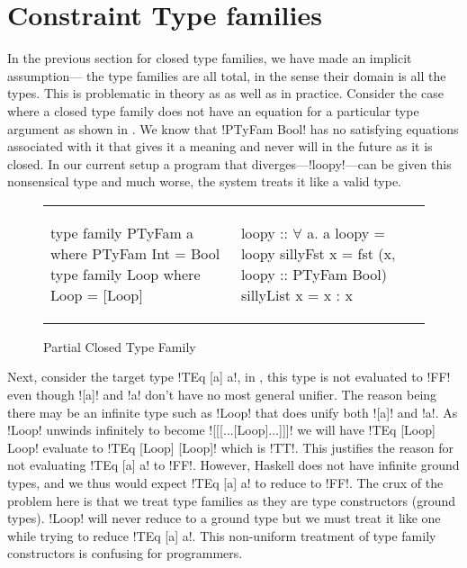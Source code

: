 \documentclass[format=acmsmall,manuscript,review,screen,nonacm,margin=1in,11pt]{acmart}
\begin{document}
\section{Constraint Type families}\label{sec:tf-constrained}
In the previous section for closed type families, we have made an implicit assumption---
the type families are all total, in the sense their domain is all the types.
This is problematic in theory as as well as in practice.
Consider the case where a closed type family does not have an equation for a particular type argument
as shown in . We know that !PTyFam Bool!
has no satisfying equations associated with it that gives it a meaning and never will in the future
as it is closed. In our current setup a program that diverges---!loopy!---can be given
this nonsensical type and much worse, the system treats it like a valid type.
\begin{figure}[ht]
    \footnotesize
  \begin{tabular}{l l}
\begin{code}
type family PTyFam a where
  PTyFam Int = Bool
type family Loop where
  Loop = [Loop]
\end{code}&%
\begin{code}
loopy :: $\forall$ a. a
loopy = loopy
sillyFst x = fst (x, loopy :: PTyFam Bool)
sillyList x = x : x
\end{code}
  \end{tabular}
  \caption{Partial Closed Type Family}
  \label{fig:incomplete-tyfam}
\end{figure}

Next, consider the target type !TEq [a] a!, in \CLTF, this type is not evaluated to
!FF! even though ![a]! and !a! don't have no most general unifier. The reason being there
may be an infinite type such as !Loop! that does unify both ![a]! and !a!. As
!Loop! unwinds infinitely to become ![[[$\ldots$[Loop]$\ldots$]]]! we will have
!TEq [Loop] Loop! evaluate to !TEq [Loop] [Loop]! which is !TT!. This justifies the
reason for not evaluating !TEq [a] a! to !FF!. However, Haskell does not have infinite ground types,
and we thus would expect !TEq [a] a! to reduce to !FF!.
The crux of the problem here is that we treat type families as they are type constructors (ground types).
!Loop! will never reduce to a ground type but we must treat it like one while trying to reduce !TEq [a] a!.
This non-uniform treatment of type family constructors is confusing for programmers.
\end{document}
